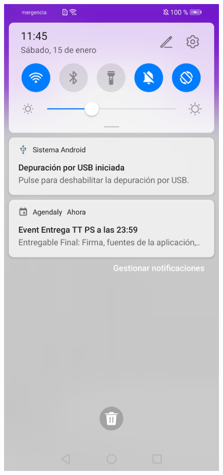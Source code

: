 \documentclass[a4paper,openright,12pt]{article}
\begin{document}
\begin{figure}
            \includegraphics[scale=0.05]{calendar5.jpg}\hfill

\end{figure}
\end{document}
